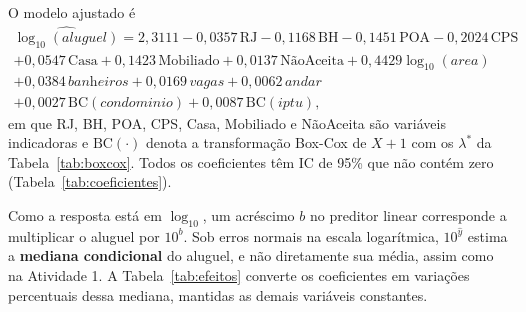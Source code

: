 \documentclass[12pt,a4paper]{article}
\begin{document}


\begin{table}[H]
\centering
\caption{Coeficientes do modelo final, com IC nominais de 95\%. Resposta: $\log_{10}(\text{Aluguel})$; referências: São Paulo, Apartamento, Não mobiliado e Aceita.}
\label{tab:coeficientes}
\footnotesize

\end{table}

O modelo ajustado é
\begin{multline*}
  \widehat{\log_{10}(\textit{aluguel})} = 2{,}3111
  - 0{,}0357\,\text{RJ} - 0{,}1168\,\text{BH} - 0{,}1451\,\text{POA} - 0{,}2024\,\text{CPS} \\
  + 0{,}0547\,\text{Casa} + 0{,}1423\,\text{Mobiliado} + 0{,}0137\,\text{NãoAceita}
  + 0{,}4429\log_{10}(\textit{area}) \\
  + 0{,}0384\,\textit{banheiros} + 0{,}0169\,\textit{vagas} + 0{,}0062\,\textit{andar} \\
  + 0{,}0027\,\mathrm{BC}(\textit{condominio}) + 0{,}0087\,\mathrm{BC}(\textit{iptu}),
\end{multline*}
em que RJ, BH, POA, CPS, Casa, Mobiliado e NãoAceita são variáveis indicadoras e $\mathrm{BC}(\cdot)$ denota a transformação Box-Cox de $X+1$ com os $\lambda^*$ da Tabela~\ref{tab:boxcox}. Todos os coeficientes têm IC de 95\% que não contém zero (Tabela~\ref{tab:coeficientes}).

Como a resposta está em $\log_{10}$, um acréscimo $b$ no preditor linear corresponde a multiplicar o aluguel por $10^{b}$. Sob erros normais na escala logarítmica, $10^{\widehat{y}}$ estima a \textbf{mediana condicional} do aluguel, e não diretamente sua média, assim como na Atividade 1. A Tabela~\ref{tab:efeitos} converte os coeficientes em variações percentuais dessa mediana, mantidas as demais variáveis constantes.

\begin{table}[H]
\centering
\caption{Efeitos estimados na escala original: variação percentual da mediana condicional do aluguel, com as demais variáveis constantes.}
\label{tab:efeitos}
\footnotesize

\end{table}
\end{document}
